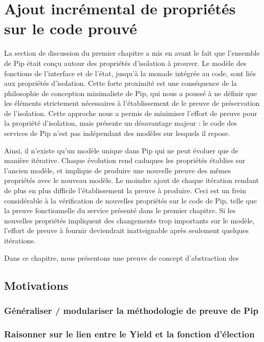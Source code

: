 \chapter{Ajout incrémental de propriétés sur le code prouvé}

	La section de discussion du premier chapitre a mis en avant le fait que l'ensemble de Pip était conçu autour des propriétés d'isolation à prouver. Le modèle des fonctions de l'interface et de l'état, jusqu'à la monade intégrée au code, sont liés aux propriétés d'isolation. Cette forte proximité est une conséquence de la philosophie de conception minimaliste de Pip, qui nous a poussé à ne définir que les éléments strictement nécessaires à l'établissement de le preuve de préservation de l'isolation. Cette approche nous a permis de minimiser l'effort de preuve pour la propriété d'isolation, mais présente un désavantage majeur : le code des services de Pip n'est pas indépendant des modèles sur lesquels il repose.

	Ainsi, il n'existe qu'un modèle unique dans Pip qui ne peut évoluer que de manière itérative. Chaque évolution rend caduques les propriétés établies sur l'ancien modèle, et implique de produire une nouvelle preuve des mêmes propriétés avec le nouveau modèle. Le moindre ajout de chaque itération rendant de plus en plus difficile l'établissement la preuve à produire.
	Ceci est un frein considérable à la vérification de nouvelles propriétés sur le code de Pip, telle que la preuve fonctionnelle du service présenté dans le premier chapitre. Si les nouvelles propriétés impliquent des changements trop importants sur le modèle, l'effort de preuve à fournir deviendrait inatteignable après seulement quelques itérations.

	Dans ce chapitre, nous présentons une preuve de concept d'abstraction des
	\section{Motivations}
		\subsection{Généraliser / modulariser la méthodologie de preuve de Pip}

		\subsection{Raisonner sur le lien entre le Yield et la fonction d'élection}
	

